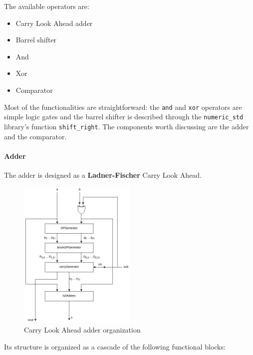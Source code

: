 The available operators are:
\begin{itemize}
    \item Carry Look Ahead adder
    \item Barrel shifter
    \item And
    \item Xor
    \item Comparator
\end{itemize}

Most of the functionalities are straightforward: the \texttt{and} and \texttt{xor} operators are simple logic gates and
the barrel shifter is described through the \texttt{numeric\_std} library's function \texttt{shift\_right}.
The components worth discussing are the adder and the comparator.

\paragraph{Adder}
The adder is designed as a \textbf{Ladner-Fischer} Carry Look Ahead.
\begin{figure}[htbp]
    \center
	\includegraphics[width=0.5\textwidth]{./2-implementation/images/AdderCLADiagram.png}
	\caption{Carry Look Ahead adder organization}
	\label{fig:adder-diagram}
\end{figure}
Its structure is organized as a cascade of the following functional blocks:
